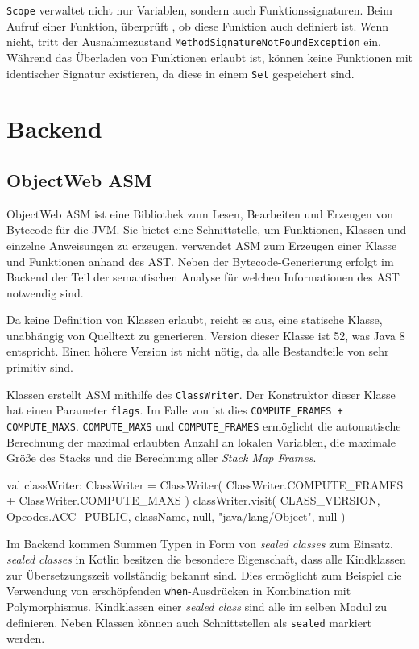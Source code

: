 \texttt{Scope} verwaltet nicht nur Variablen, sondern auch Funktionssignaturen. Beim Aufruf einer Funktion, überprüft \scope, ob diese Funktion auch definiert ist. Wenn nicht, tritt der Ausnahmezustand \texttt{MethodSignatureNotFoundException} ein. Während das Überladen von Funktionen erlaubt ist, können keine Funktionen mit identischer Signatur existieren, da diese in einem \texttt{Set} gespeichert sind.

\section{Backend}

\subsection{ObjectWeb ASM}

ObjectWeb ASM ist eine Bibliothek zum Lesen, Bearbeiten und Erzeugen von Bytecode für die JVM. Sie bietet eine Schnittstelle, um Funktionen, Klassen und einzelne Anweisungen zu erzeugen. \toya verwendet ASM zum Erzeugen einer Klasse und Funktionen anhand des AST. Neben der Bytecode-Generierung erfolgt im Backend der Teil der semantischen Analyse für welchen Informationen des AST notwendig sind.

Da \toya keine Definition von Klassen erlaubt, reicht es aus, eine statische Klasse, unabhängig von Quelltext zu generieren. Version dieser Klasse ist 52, was Java 8 entspricht. Einen höhere Version ist nicht nötig, da alle Bestandteile von \toya sehr primitiv sind.

Klassen erstellt ASM mithilfe des \texttt{ClassWriter}. Der Konstruktor dieser Klasse hat einen Parameter \texttt{flags}. Im Falle von \toya ist dies \texttt{COMPUTE\_FRAMES + COMPUTE\_MAXS}. \texttt{COMPUTE\_MAXS} und \texttt{COMPUTE\_FRAMES} ermöglicht die automatische Berechnung der maximal erlaubten Anzahl an lokalen Variablen, die maximale Größe des Stacks und die Berechnung aller \textit{Stack Map Frames}.

\begin{KotlinCode}[numbers=none, caption={ASM Code zum Erstellen der Klasse, welche ein \toya Programm definiert.}]
val classWriter: ClassWriter = ClassWriter(
    ClassWriter.COMPUTE_FRAMES + ClassWriter.COMPUTE_MAXS
)
classWriter.visit(
    CLASS_VERSION,
    Opcodes.ACC_PUBLIC,
    className,
    null,
    "java/lang/Object",
    null
)
\end{KotlinCode}

Im Backend kommen Summen Typen in Form von \textit{sealed classes} zum Einsatz. \textit{sealed classes} in Kotlin besitzen die besondere Eigenschaft, dass alle Kindklassen zur Übersetzungszeit vollständig bekannt sind. Dies ermöglicht zum Beispiel die Verwendung von erschöpfenden \texttt{when}-Ausdrücken in Kombination mit Polymorphismus. Kindklassen einer \textit{sealed class} sind alle im selben Modul zu definieren. Neben Klassen können auch Schnittstellen als \texttt{sealed} markiert werden.

